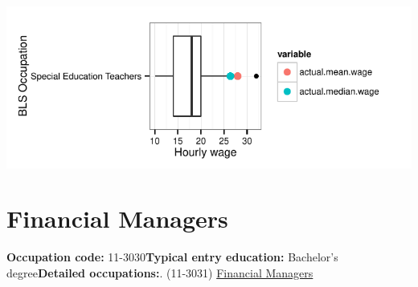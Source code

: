 \documentclass[a4paper,10pt]{article}\usepackage[]{graphicx}\usepackage[]{color}
\makeatletter
\def\maxwidth{ %
  \ifdim\Gin@nat@width>\linewidth
    \linewidth
  \else
    \Gin@nat@width
  \fi
}
\makeatother
\begin{document}
{\centering \includegraphics[width=\maxwidth]{figure/unnamed-chunk-270} 

}


\newpage\section{Financial Managers}\textbf{Occupation code:} 11-3030\newline\textbf{Typical entry education:} Bachelor's degree\newline\textbf{Detailed occupations:}. (11-3031)  \href{http://www.bls.gov/oes/current/oes113031.htm}{Financial Managers}\newline%
\end{document}
